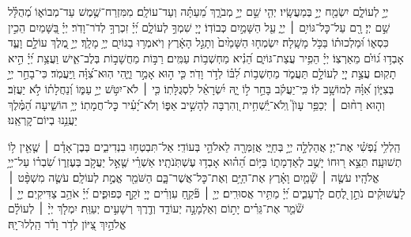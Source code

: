 \label{yehikvod}
יְיָ֣ לְעוֹלָ֑ם יִשְׂמַ֖ח יְיָ֣ בְּמַעֲשָֽׂיו׃
יְהִ֤י שֵׁ֣ם יְיָ֣ מְבֹרָ֑ךְ מֵ֝עַתָּ֗ה וְעַד־עוֹלָֽם׃
מִמִּזְרַח־שֶׁ֥מֶשׁ עַד־מְבוֹא֑וֹ מְ֝הֻלָּ֗ל שֵׁ֣ם יְיָ׃
רָ֖ם עַל־כׇּל־גּוֹיִ֥ם ׀ יְיָ֑ עַ֖ל הַשָּׁמַ֣יִם כְּבוֹדֽוֹ׃
 יְיָ֭ שִׁמְךָ֣ לְעוֹלָ֑ם יְ֝יָ֗ זִכְרְךָ֥ לְדֹר־וָדֹֽר׃
 יְיָ֗ בַּ֭שָּׁמַיִם הֵכִ֣ין כִּסְא֑וֹ וּ֝מַלְכוּת֗וֹ בַּכֹּ֥ל מָשָֽׁלָה׃
 יִשְׂמְח֤וּ הַשָּׁמַ֙יִם֙ וְתָגֵ֣ל הָאָ֔רֶץ וְיֹאמְר֥וּ בַגּוֹיִ֖ם יְיָ֥ מָלָֽךְ׃
\melekhmalakhyimlokh
{} יְיָ֣ מֶ֭לֶךְ עוֹלָ֣ם וָעֶ֑ד אָבְד֥וּ ג֝וֹיִ֗ם מֵאַרְצֽוֹ׃
 יְיָ֗ הֵפִ֥יר עֲצַת־גּוֹיִ֑ם הֵ֝נִ֗יא מַחְשְׁב֥וֹת עַמִּֽים׃
רַבּ֣וֹת מַחֲשָׁב֣וֹת בְּלֶב־אִ֑ישׁ וַעֲצַ֥ת יְ֝יָ֗ הִ֣יא תָקֽוּם׃
עֲצַ֣ת יְיָ֭ לְעוֹלָ֣ם תַּעֲמֹ֑ד מַחְשְׁב֥וֹת לִ֝בּ֗וֹ לְדֹ֣ר וָדֹֽר׃
כִּ֤י ה֣וּא אָמַ֣ר וַיֶּ֑הִי הֽוּא־צִ֝וָּ֗ה וַֽיַּעֲמֹֽד׃
כִּי־בָחַ֣ר יְיָ֣ בְּצִיּ֑וֹן אִ֝וָּ֗הּ לְמוֹשָׁ֥ב לֽוֹ׃
כִּֽי־יַעֲקֹ֗ב בָּחַ֣ר ל֣וֹ יָ֑הּ יִ֝שְׂרָאֵ֗ל לִסְגֻלָּתֽוֹ׃
כִּ֤י ׀ לֹא־יִטֹּ֣שׁ יְיָ֣ עַמּ֑וֹ וְ֝נַחֲלָת֗וֹ לֹ֣א יַעֲזֹֽב׃
וְה֤וּא רַח֨וּם ׀ יְכַפֵּ֥ר עָוֺן֮ וְֽלֹא־יַֽ֫שְׁחִ֥ית וְ֭הִרְבָּה לְהָשִׁ֣יב אַפּ֑וֹ
וְלֹא־יָ֝עִ֗יר כׇּל־חֲמָתֽוֹ׃
 יְיָ֥ הוֹשִׁ֑יעָה הַ֝מֶּ֗לֶךְ יַעֲנֵ֥נוּ בְיוֹם־קׇרְאֵֽנוּ׃

\ashrei
\enlargethispage{\baselineskip}

הַֽלְלִ֥י נַ֝פְשִׁ֗י אֶת־יְיָ׃
אֲהַלְלָ֣ה יְיָ֣ בְּחַיָּ֑י אֲזַמְּרָ֖ה לֵאלֹהַ֣י בְּעוֹדִֽי׃
אַל־תִּבְטְח֥וּ בִנְדִיבִ֑ים בְּבֶן־אָדָ֓ם ׀ שֶׁ֤אֵ֖ין ל֥וֹ תְשׁוּעָֽה׃
תֵּצֵ֣א ר֭וּחוֹ יָשֻׁ֣ב לְאַדְמָת֑וֹ בַּיּ֥וֹם הַ֝ה֗וּא אָבְד֥וּ עֶשְׁתֹּֽנֹתָֽיו׃
אַשְׁרֵ֗י שֶׁ֤אֵ֣ל יַעֲקֹ֣ב בְּעֶזְר֑וֹ שִׂ֝בְר֗וֹ עַל־יְיָ֥ אֱלֹהָֽיו׃
עֹשֶׂ֤ה ׀ שָׁ֘מַ֤יִם וָאָ֗רֶץ אֶת־הַיָּ֥ם וְאֶת־כׇּל־אֲשֶׁר־בָּ֑ם הַשֹּׁמֵ֖ר אֱמֶ֣ת לְעוֹלָֽם׃
עֹשֶׂ֤ה מִשְׁפָּ֨ט ׀ לָעֲשׁוּקִ֗ים נֹתֵ֣ן לֶ֭חֶם לָרְעֵבִ֑ים יְ֝יָ֗ מַתִּ֥יר אֲסוּרִֽים׃
יְיָ֤ ׀ פֹּ֘קֵ֤חַ עִוְרִ֗ים יְיָ֭ זֹקֵ֣ף כְּפוּפִ֑ים יְ֝יָ֗ אֹהֵ֥ב צַדִּיקִֽים׃
יְיָ֤ ׀ שֹׁ֘מֵ֤ר אֶת־גֵּרִ֗ים יָת֣וֹם וְאַלְמָנָ֣ה יְעוֹדֵ֑ד וְדֶ֖רֶךְ רְשָׁעִ֣ים יְעַוֵּֽת׃
יִמְלֹ֤ךְ יְיָ֨ ׀ לְעוֹלָ֗ם\\ אֱלֹהַ֣יִךְ צִ֭יּוֹן לְדֹ֥ר וָדֹ֗ר הַֽלְלוּ־יָֽהּ׃



